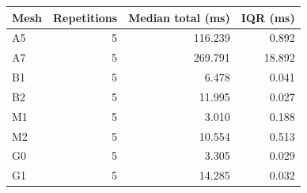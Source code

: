 \begin{tabular}{@{}lrrr@{}}
\toprule
Mesh & Repetitions & Median total (ms) & IQR (ms)\\
\midrule
A5 & 5 & 116.239 & 0.892\\
A7 & 5 & 269.791 & 18.892\\
B1 & 5 & 6.478 & 0.041\\
B2 & 5 & 11.995 & 0.027\\
M1 & 5 & 3.010 & 0.188\\
M2 & 5 & 10.554 & 0.513\\
G0 & 5 & 3.305 & 0.029\\
G1 & 5 & 14.285 & 0.032\\
\bottomrule
\end{tabular}
